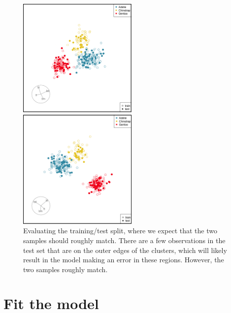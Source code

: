 \documentclass[
  letterpaper,
]{krantz}
\begin{document}
\begin{figure}

\begin{minipage}{0.50\linewidth}

\includegraphics[width=2.29167in,height=\textheight]{images/p_split.png}

\end{minipage}%
%
\begin{minipage}{0.50\linewidth}

\includegraphics[width=2.29167in,height=\textheight]{images/p_split_guided.png}

\end{minipage}%

\caption{\label{fig-p-split-pdf}Evaluating the training/test split,
where we expect that the two samples should roughly match. There are a
few observations in the test set that are on the outer edges of the
clusters, which will likely result in the model making an error in these
regions. However, the two samples roughly match.}

\end{figure}%

\section{Fit the model}\label{fit-the-model}
\end{document}
